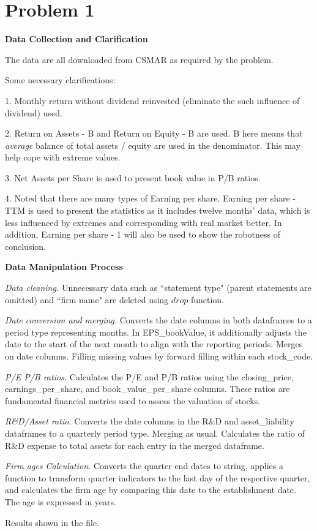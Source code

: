 
\section*{Problem 1}

\noindent
\textbf{Data Collection and Clarification}

The data are all downloaded from CSMAR as required by the problem.

Some necessary clarifications:


1. Monthly return without dividend reinvested (eliminate the such influence of dividend) used.

2. Return on Assets - B and Return on Equity - B are used. B here means that \textit{average} balance of total assets / equity are used in the denominator. This may help cope with extreme values.

3. Net Assets per Share is used to present book value in P/B ratios.


4. Noted that there are many types of Earning per share. Earning per share - TTM is used to present the statistics as it includes twelve months' data, which is less influenced by extremes and corresponding with real market better. In addition, Earning per share - 1 will also be used to show the robotness of conclusion.
\\

\noindent
\begin{Question} 


\noindent
\textbf{Data Manipulation Process}

\textit{Data cleaning.} Unnecessary data such as ``statement type" (parent statements are omitted) and ``firm name" are deleted using $drop$ function. 


\textit{Date conversion and merging.} Converts the date columns in both dataframes to a period type representing months. In EPS\_bookValue, it additionally adjusts the date to the start of the next month to align with the reporting periods. Merges on date columns. Filling missing values by forward filling within each stock\_code. 


\textit{P/E P/B ratios.} Calculates the P/E and P/B ratios using the closing\_price, earnings\_per\_share, and book\_value\_per\_share columns. These ratios are fundamental financial metrics used to assess the valuation of stocks.


\textit{R\&D/Asset ratio.} Converts the date columns in the R\&D and asset\_liability dataframes to a quarterly period type. Merging as usual. Calculates the ratio of R\&D expense to total assets for each entry in the merged dataframe.


\textit{Firm ages Calculation.} Converts the quarter end dates to string, applies a function to transform quarter indicators to the last day of the respective quarter, and calculates the firm age by comparing this date to the establishment date. The age is expressed in years.


Results shown in the file.\\


\end{Question}

